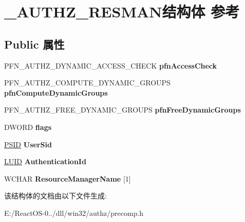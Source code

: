 \hypertarget{struct___a_u_t_h_z___r_e_s_m_a_n}{}\section{\+\_\+\+A\+U\+T\+H\+Z\+\_\+\+R\+E\+S\+M\+A\+N结构体 参考}
\label{struct___a_u_t_h_z___r_e_s_m_a_n}
\subsection*{Public 属性}
\begin{DoxyCompactItemize}
\item 
\mbox{\label{struct___a_u_t_h_z___r_e_s_m_a_n_abe4846b64d645130353f5eed963080e2}} 
P\+F\+N\+\_\+\+A\+U\+T\+H\+Z\+\_\+\+D\+Y\+N\+A\+M\+I\+C\+\_\+\+A\+C\+C\+E\+S\+S\+\_\+\+C\+H\+E\+CK {\bfseries pfn\+Access\+Check}
\item 
\mbox{\label{struct___a_u_t_h_z___r_e_s_m_a_n_a6b54f11cefdfd1dd257259283c7eaed5}} 
P\+F\+N\+\_\+\+A\+U\+T\+H\+Z\+\_\+\+C\+O\+M\+P\+U\+T\+E\+\_\+\+D\+Y\+N\+A\+M\+I\+C\+\_\+\+G\+R\+O\+U\+PS {\bfseries pfn\+Compute\+Dynamic\+Groups}
\item 
\mbox{\label{struct___a_u_t_h_z___r_e_s_m_a_n_aee7fc827916f3e8b0443e315aec225f6}} 
P\+F\+N\+\_\+\+A\+U\+T\+H\+Z\+\_\+\+F\+R\+E\+E\+\_\+\+D\+Y\+N\+A\+M\+I\+C\+\_\+\+G\+R\+O\+U\+PS {\bfseries pfn\+Free\+Dynamic\+Groups}
\item 
\mbox{\label{struct___a_u_t_h_z___r_e_s_m_a_n_a591f37d7912f27b1cdc2a4ec6821aa03}} 
D\+W\+O\+RD {\bfseries flags}
\item 
\mbox{\label{struct___a_u_t_h_z___r_e_s_m_a_n_ad5749e79f8db2ffc58f5daa542db125d}} 
\hyperlink{struct___s_i_d}{P\+S\+ID} {\bfseries User\+Sid}
\item 
\mbox{\label{struct___a_u_t_h_z___r_e_s_m_a_n_a9bc4fd7d0ef85538c59ba77a687424a9}} 
\hyperlink{struct___l_u_i_d}{L\+U\+ID} {\bfseries Authentication\+Id}
\item 
\mbox{\label{struct___a_u_t_h_z___r_e_s_m_a_n_a1343992985ba4a3930f3f276106e33ab}} 
W\+C\+H\+AR {\bfseries Resource\+Manager\+Name} \mbox{[}1\mbox{]}
\end{DoxyCompactItemize}


该结构体的文档由以下文件生成\+:\begin{DoxyCompactItemize}
\item 
E\+:/\+React\+O\+S-\/0../dll/win32/authz/precomp.\+h\end{DoxyCompactItemize}

